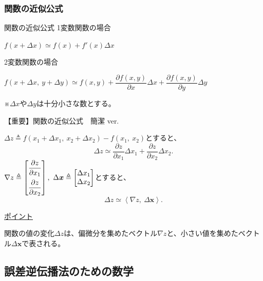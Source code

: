 \documentclass[dvipdfmx,aspectratio=169]{beamer}
\begin{document}
	\subsubsection{関数の近似公式}
	\begin{frame}{関数の近似公式}
		1変数関数の場合
		\begin{screen}
			$ f(x+\Delta x) \simeq f(x) + f'(x)\Delta x $
		\end{screen}
		2変数関数の場合
		\begin{screen}
			$ f(x+\Delta x,\ y+\Delta y) \simeq f(x,y) + \dfrac{\partial f(x,y)}{\partial x}\Delta x + \dfrac{\partial f(x,y)}{\partial y}\Delta y $
		\end{screen}
		※$ \Delta x $や$ \Delta y $は十分小さな数とする。
	\end{frame}
	\begin{frame}[shrink]{【重要】関数の近似公式　簡潔 ver.}
		\begin{screen}
			$ \Delta z \triangleq f(x_1+\Delta x_1,\ x_2+\Delta x_2) - f(x_1,\ x_2) $とすると、
			\begin{equation*}
				\Delta z \simeq \dfrac{\partial z}{\partial x_1} \Delta x_1 + \dfrac{\partial z}{\partial x_2} \Delta x_2.
			\end{equation*}
			$ \nabla z \triangleq \begin{bmatrix}
				\dfrac{\partial z}{\partial x_1}\vspace{0.5em}\\
				\dfrac{\partial z}{\partial x_2}
			\end{bmatrix},\ \Delta \boldsymbol{x} \triangleq \begin{bmatrix}
				\Delta x_1\\
				\Delta x_2
			\end{bmatrix} $とすると、
			\begin{equation*}
				\Delta z \simeq \left\langle \nabla z,\ \Delta \boldsymbol{x} \right\rangle.
			\end{equation*}
		\end{screen}
		
		\underline{ポイント}　
		
		関数の値の変化$ \Delta z $は、偏微分を集めたベクトル$ \nabla z $と、小さい値を集めたベクトル$ \Delta \boldsymbol{x} $で表される。
	\end{frame}
	
	\subsection{誤差逆伝播法のための数学}
\end{document}
